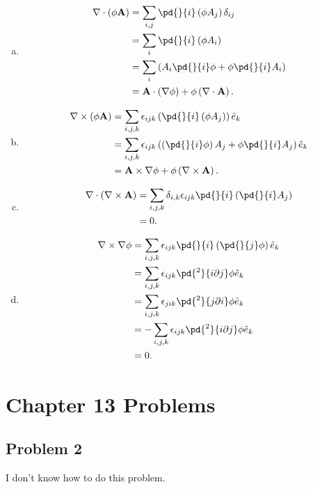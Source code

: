 \documentclass[10pt]{mypackage}
\begin{document}
\begin{enumerate}[(a)]
  \item 
    \begin{align*}
      \nabla \cdot \left(\phi \mathbf{A}\right) &= \sum_{i,j}\pd{}{i}\left(\phi A_{j}\right)\delta_{ij}\\
                                                &= \sum_{i}\pd{}{i}\left(\phi A_i\right)\\
                                                &= \sum_{i}\left(A_i\pd{}{i}\phi + \phi \pd{}{i}A_i\right)\\
                                                &= \mathbf{A}\cdot \left(\nabla \phi\right) + \phi \left(\nabla \cdot \mathbf{A}\right).
    \end{align*}
  \item 
    \begin{align*}
      \nabla \times \left(\phi \mathbf{A}\right) &= \sum_{i,j,k}\epsilon_{ijk}\left(\pd{}{i}\left(\phi A_j\right)\right)\hat{e}_k\\
                                                 &= \sum_{i,j,k}\epsilon_{ijk}\left(\left(\pd{}{i}\phi\right)A_j + \phi \pd{}{i}A_j\right)\hat{e}_k\\
                                                 &= \mathbf{A}\times \nabla \phi + \phi \left(\nabla \times \mathbf{A}\right).
    \end{align*}
  \item 
    \begin{align*}
      \nabla \cdot \left(\nabla \times \mathbf{A}\right) &= \sum_{i,j,k}\delta_{i,k}\epsilon_{ijk}\pd{}{i}\left(\pd{}{i}A_j\right)\\
                                                         &= 0.
    \end{align*}
  \item
    \begin{align*}
      \nabla \times \nabla \phi &= \sum_{i,j,k}\epsilon_{ijk}\pd{}{i}\left(\pd{}{j}\phi\right)\hat{e}_k\\
                                &= \sum_{i,j,k}\epsilon_{ijk}\pd{^2}{i\partial j}\phi \hat{e}_k\\
                                &= \sum_{i,j,k}\epsilon_{jik}\pd{^2}{j\partial i}\phi \hat{e}_k\\
                                &= -\sum_{i,j,k}\epsilon_{ijk}\pd{^2}{i\partial j}\phi \hat{e}_k\\
                                &= 0.
    \end{align*}
\end{enumerate}
\section{Chapter 13 Problems}%
\subsection{Problem 2}%
I don't know how to do this problem.
\end{document}
